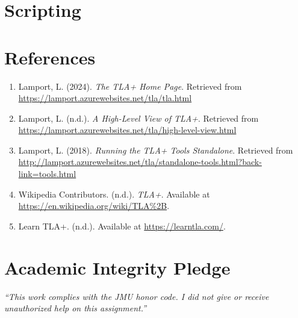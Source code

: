 \documentclass{article}
\begin{document}
\newpage
\section*{Scripting}



\newpage
\section*{References}
\begin{enumerate}
\item Lamport, L. (2024). \textit{The TLA+ Home Page}. Retrieved from \url{https://lamport.azurewebsites.net/tla/tla.html}
\item Lamport, L. (n.d.). \textit{A High-Level View of TLA+}. Retrieved from \url{https://lamport.azurewebsites.net/tla/high-level-view.html}
\item Lamport, L. (2018). \textit{Running the TLA+ Tools Standalone}. Retrieved from \url{http://lamport.azurewebsites.net/tla/standalone-tools.html?back-link=tools.html}
\item Wikipedia Contributors. (n.d.). \textit{TLA+}. Available at \url{https://en.wikipedia.org/wiki/TLA%2B}.
\item Learn TLA+. (n.d.). Available at \url{https://learntla.com/}.
\end{enumerate}

\vfill 
  \section*{Academic Integrity Pledge}
   {\color{red}\textit{“This work complies with the JMU honor code. I did not give or receive unauthorized help on this assignment.”}}
\end{document}
